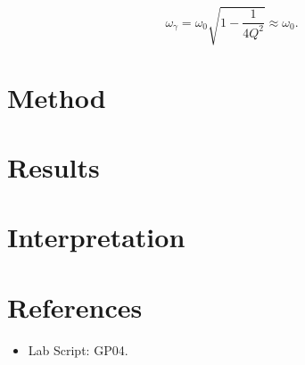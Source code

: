 \documentclass[11pt]{article}
\begin{document}
\begin{equation}
    \omega _{\gamma } = \omega _{0}\sqrt{1-\frac{1}{4Q^2} } \approx \omega _{0}.    
\end{equation}




\section{Method}


\section{Results}



\section{Interpretation}


\section{References}
\begin{itemize}
    \item Lab Script: GP04.
\end{itemize}
\end{document}
